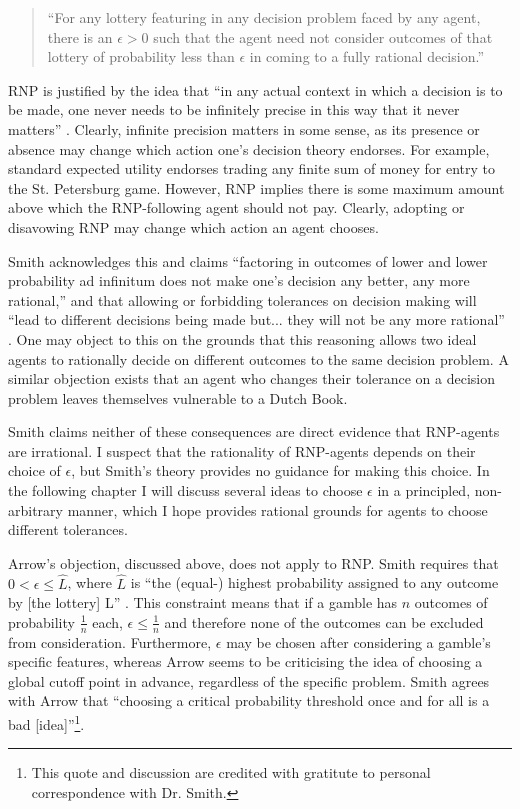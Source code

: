 \documentclass{article}
\begin{document}
\begin{quote}
``For any lottery featuring in any decision problem faced by any agent, there is an \(\epsilon > 0\) such that the agent need not consider outcomes of that lottery of probability less than \(\epsilon\) in coming to a fully rational decision.''
\end{quote}

RNP is justified by the idea that ``in any actual context in which a decision is to be made, one never needs to be infinitely precise in this way \textemdash{} that it never matters'' \citep[pg. 474]{smith2014evaluative}. Clearly, infinite precision matters in some sense, as its presence or absence may change which action one's decision theory endorses. For example, standard expected utility endorses trading any finite sum of money for entry to the St. Petersburg game. However, RNP implies there is some maximum amount above which the RNP-following agent should not pay. Clearly, adopting or disavowing RNP may change which action an agent chooses.

Smith acknowledges this and claims ``factoring in outcomes of lower and lower probability ad infinitum does not make one’s decision any better, any more rational,'' and that allowing or forbidding tolerances on decision making will ``lead to different decisions being made \textemdash{} but... they will not be any more rational'' \citep[pg. 475]{smith2014evaluative}. One may object to this on the grounds that this reasoning allows two ideal agents to rationally decide on different outcomes to the same decision problem. A similar objection exists that an agent who changes their tolerance on a decision problem leaves themselves vulnerable to a Dutch Book. 

Smith claims neither of these consequences are direct evidence that RNP-agents are irrational. I suspect that the rationality of RNP-agents depends on their choice of \(\epsilon\), but Smith's theory provides no guidance for making this choice. In the following chapter I will discuss several ideas to choose \(\epsilon\) in a principled, non-arbitrary manner, which I hope provides rational grounds for agents to choose different tolerances. 

Arrow's objection, discussed above, does not apply to RNP. Smith requires that \(0 < \epsilon \leq \hat{L}\), where \(\hat{L}\) is ``the (equal-) highest probability assigned to any outcome by [the lottery] L'' \citep[pg. 479]{smith2014evaluative}. This constraint means that if a gamble has \(n\) outcomes of probability \(\frac{1}{n}\) each, \(\epsilon \leq \frac{1}{n}\) and therefore none of the outcomes can be excluded from consideration. Furthermore, \(\epsilon\) may be chosen after considering a gamble's specific features, whereas Arrow seems to be criticising the idea of choosing a global cutoff point in advance, regardless of the specific problem. Smith agrees with Arrow that ``choosing a critical probability threshold once and for all is a bad [idea]''\footnote{This quote and discussion are credited with gratitute to personal correspondence with Dr. Smith.}.
\end{document}
